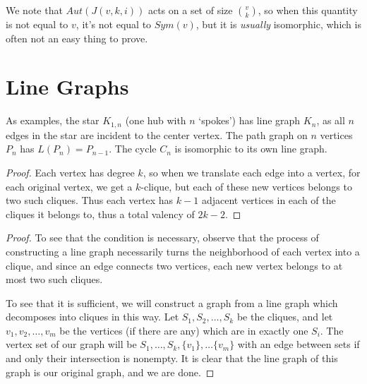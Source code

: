We note that $Aut(J(v,k,i))$ acts on a set of size $\binom{v}{k}$, so when this quantity is not equal to $v$, it's not equal to $Sym(v)$, but it is \textit{usually} isomorphic, which is often not an easy thing to prove.


\section*{Line Graphs}


As examples, the star $K_{1,n}$ (one hub with $n$ `spokes') has line graph $K_n$, as all $n$ edges in the star are incident to the center vertex.  The path graph on $n$ vertices $P_n$ has $L(P_n)=P_{n-1}$.  The cycle $C_n$ is isomorphic to its own line graph.


\begin{proof}
	Each vertex has degree $k$, so when we translate each edge into a vertex, for each original vertex, we get a $k$-clique, but each of these new vertices belongs to two such cliques.  Thus each vertex has $k-1$ adjacent vertices in each of the cliques it belongs to, thus a total valency of $2k-2$.
\end{proof}



\begin{proof}
	
	To see that the condition is necessary, observe that the process of constructing a line graph necessarily turns the neighborhood of each vertex into a clique, and since an edge connects two vertices, each new vertex belongs to at most two such cliques.
	
	To see that it is sufficient, we will construct a graph from a line graph which decomposes into cliques in this way.  Let $S_1,S_2,\dots,S_k$ be the cliques, and let $v_1,v_2,\dots,v_m$ be the vertices (if there are any) which are in exactly one $S_i$.  The vertex set of our graph will be $S_1,\dots,S_k,\{v_1\},\dots \{v_m\}$ with an edge between sets if and only their intersection is nonempty.  It is clear that the line graph of this graph is our original graph, and we are done.
	
\end{proof}

